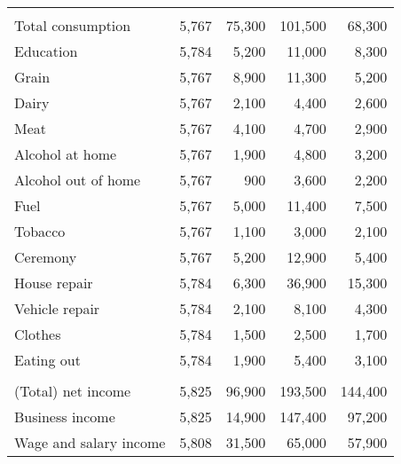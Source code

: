 \begin{table}[H]
{\begin{tabular}{lrrrr}
\addlinespace[0.3em]
\multicolumn{5}{l}{\textbf{Consumption variables}}\\
\hspace{1em}Total consumption & 5,767 & 75,300 & 101,500 & 68,300\\
\hspace{1em}Education & 5,784 & 5,200 & 11,000 & 8,300\\
\hspace{1em}Grain & 5,767 & 8,900 & 11,300 & 5,200\\
\hspace{1em}Dairy & 5,767 & 2,100 & 4,400 & 2,600\\
\hspace{1em}Meat & 5,767 & 4,100 & 4,700 & 2,900\\
\hspace{1em}Alcohol at home & 5,767 & 1,900 & 4,800 & 3,200\\
\hspace{1em}Alcohol out of home & 5,767 & 900 & 3,600 & 2,200\\
\hspace{1em}Fuel & 5,767 & 5,000 & 11,400 & 7,500\\
\hspace{1em}Tobacco & 5,767 & 1,100 & 3,000 & 2,100\\
\hspace{1em}Ceremony & 5,767 & 5,200 & 12,900 & 5,400\\
\hspace{1em}House repair & 5,784 & 6,300 & 36,900 & 15,300\\
\hspace{1em}Vehicle repair & 5,784 & 2,100 & 8,100 & 4,300\\
\hspace{1em}Clothes & 5,784 & 1,500 & 2,500 & 1,700\\
\hspace{1em}Eating out & 5,784 & 1,900 & 5,400 & 3,100\\
\addlinespace[0.3em]
\multicolumn{5}{l}{\textbf{Income and asset variables}}\\
\hspace{1em}(Total) net income & 5,825 & 96,900 & 193,500 & 144,400\\
\hspace{1em}Business income & 5,825 & 14,900 & 147,400 & 97,200\\
\hspace{1em}Wage and salary income & 5,808 & 31,500 & 65,000 & 57,900\\

\end{tabular}}
\end{table}
